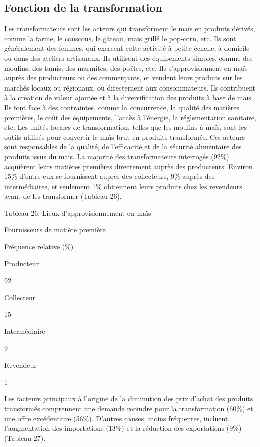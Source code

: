 \documentclass[12pt,oneside]{report}
\begin{document}
\subsection{Fonction de la transformation}
Les transformateurs sont les acteurs qui transforment le maïs en produits dérivés, comme la farine, le couscous, le gâteau, maïs grillé le pop-corn, etc. Ils sont généralement des femmes, qui exercent cette activité à petite échelle, à domicile ou dans des ateliers artisanaux. Ils utilisent des équipements simples, comme des moulins, des tamis, des marmites, des poêles, etc. Ils s'approvisionnent en maïs auprès des producteurs ou des commerçants, et vendent leurs produits sur les marchés locaux ou régionaux, ou directement aux consommateurs. Ils contribuent à la création de valeur ajoutée et à la diversification des produits à base de maïs. Ils font face à des contraintes, comme la concurrence, la qualité des matières premières, le coût des équipements, l'accès à l'énergie, la réglementation sanitaire, etc. Les unités locales de transformation, telles que les moulins à maïs, sont les outils utilisés pour convertir le maïs brut en produits transformés. Ces acteurs sont responsables de la qualité, de l'efficacité et de la sécurité alimentaire des produits issus du maïs. La majorité des transformateurs interrogés (92\%) acquièrent leurs matières premières directement auprès des producteurs. Environ 15\% d'entre eux se fournissent auprès des collecteurs, 9\% auprès des intermédiaires, et seulement 1\% obtiennent leurs produits chez les revendeurs avant de les transformer (Tableau 26).

Tableau 26: Lieux d’approvisionnement en maïs

Fournisseurs de matière première

Fréquence relative (\%)

Producteur

92

Collecteur

15

Intermédiaire

9

Revendeur

1

Les facteurs principaux à l'origine de la diminution des prix d'achat des produits transformés comprennent une demande moindre pour la transformation (60\%) et une offre excédentaire (56\%). D'autres causes, moins fréquentes, incluent l'augmentation des importations (13\%) et la réduction des exportations (9\%) (Tableau 27).
\end{document}
